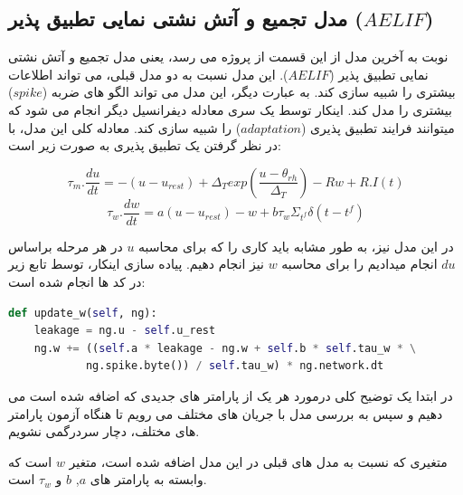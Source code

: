 \documentclass{article}
\begin{document}
        \subsection{مدل تجمیع و آتش نشتی نمایی تطبیق پذیر ($AELIF$)}
            نوبت به آخرین مدل از این قسمت از پروژه می رسد، یعنی مدل تجمیع و آتش نشتی نمایی تطبیق پذیر
            ($AELIF$).
            این مدل نسبت به دو مدل قبلی، می تواند اطلاعات بیشتری را شبیه سازی کند. به عبارت دیگر، این مدل می تواند الگو های ضربه
            ($spike$) 
            بیشتری را مدل کند. اینکار توسط یک سری معادله دیفرانسیل دیگر انجام می شود که میتوانند فرایند تطبیق پذیری
            ($adaptation$) 
            را شبیه سازی کند. معادله کلی این مدل، با در نظر گرفتن یک تطبیق پذیری به صورت زیر است:
            \begin{latin}
                \begin{equation}
                    \tau_m.\frac{du}{dt} = - (u - u_{rest}) + \Delta_T exp(\frac{u - \theta_{rh}}{\Delta_T}) - Rw + R.I(t)
                \end{equation}
                \begin{equation}
                    \tau_w.\frac{dw}{dt} = a(u - u_{rest}) - w + b\tau_w\Sigma_{t^{f}}\delta(t-t^f)
                \end{equation}
            \end{latin}
            در این مدل نیز، به طور مشابه باید کاری را که برای محاسبه 
            $u$ 
            در هر مرحله براساس 
            $du$ 
            انجام میدادیم را برای محاسبه 
            $w$ 
            نیز انجام دهیم. پیاده سازی اینکار، توسط تابع زیر در کد ها انجام شده است:
            \begin{latin}
                \centering
                \begin{lstlisting}[language=Python]
def update_w(self, ng):
    leakage = ng.u - self.u_rest
    ng.w += ((self.a * leakage - ng.w + self.b * self.tau_w * \
            ng.spike.byte()) / self.tau_w) * ng.network.dt
                \end{lstlisting}
            \end{latin}
            در ابتدا یک توضیح کلی درمورد هر یک از پارامتر های جدیدی که اضافه شده است می دهیم و سپس به بررسی مدل با جریان های مختلف می رویم تا هنگاه آزمون پارامتر های مختلف، دچار سردرگمی نشویم.

            متغیری که نسبت به مدل های قبلی در این مدل اضافه شده است، متغیر 
            $w$ 
            است که وابسته به پارامتر های 
            $a$, 
            $b$ و 
            $\tau_w$
            است.
\end{document}
